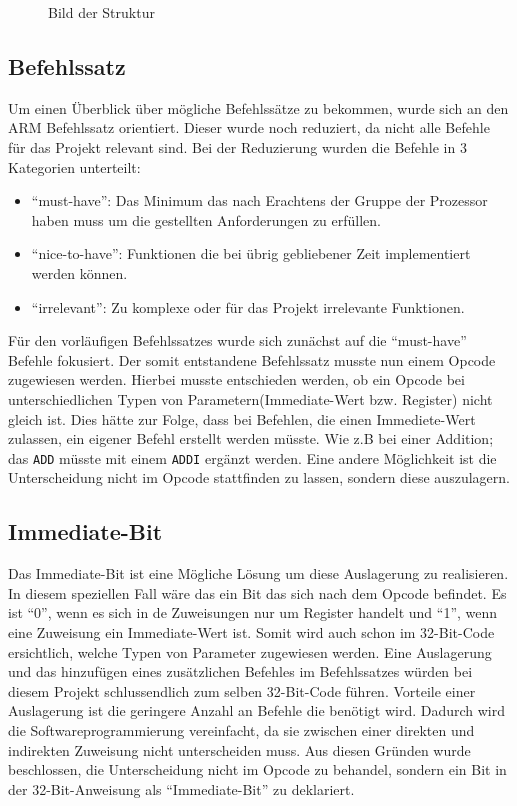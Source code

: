 \documentclass[paper=a4,fontsize=12pt,twocolumn]{scrreprt}
\begin{document}
\begin{figure}[h]
\centering
\caption{Bild der Struktur}
\end{figure}

\subsection{Befehlssatz}

Um einen Überblick über mögliche Befehlssätze zu bekommen, wurde sich an den ARM Befehlssatz orientiert\footnotemark.
Dieser wurde noch reduziert, da nicht alle Befehle für das Projekt relevant sind.
Bei der Reduzierung wurden die Befehle in 3 Kategorien unterteilt:
\begin{itemize}
    \item \enquote{must-have}:
    Das Minimum das nach Erachtens der Gruppe der Prozessor haben muss um die gestellten Anforderungen zu erfüllen.
    \item \enquote{nice-to-have}:
    Funktionen die bei übrig gebliebener Zeit implementiert werden können.
    \item \enquote{irrelevant}:
    Zu komplexe oder für das Projekt irrelevante Funktionen.
\end{itemize}
Für den vorläufigen Befehlssatzes wurde sich zunächst auf die \enquote{must-have} Befehle fokusiert. 
Der somit entstandene Befehlssatz musste nun einem Opcode zugewiesen werden. Hierbei musste entschieden werden, ob ein Opcode bei unterschiedlichen Typen von Parametern(Immediate-Wert bzw. Register) nicht gleich ist. Dies hätte zur Folge, dass bei Befehlen, die einen Immediete-Wert zulassen, ein eigener Befehl erstellt werden müsste. Wie z.B bei einer Addition; das \texttt{ADD} müsste mit einem \texttt{ADDI} ergänzt werden. Eine andere Möglichkeit ist die Unterscheidung nicht im Opcode stattfinden zu lassen, sondern diese auszulagern.


\subsection{Immediate-Bit}

Das Immediate-Bit ist eine Mögliche Lösung um diese Auslagerung zu realisieren. In diesem speziellen Fall wäre das ein Bit das sich nach dem Opcode befindet. Es ist \enquote{0}, wenn es sich in de Zuweisungen nur um Register handelt und \enquote{1}, wenn eine Zuweisung ein Immediate-Wert ist. Somit wird auch schon im 32-Bit-Code ersichtlich, welche Typen von Parameter zugewiesen werden.
Eine Auslagerung und das hinzufügen eines zusätzlichen Befehles im Befehlssatzes würden bei diesem Projekt schlussendlich zum selben 32-Bit-Code führen.
Vorteile einer Auslagerung ist die geringere Anzahl an Befehle die benötigt wird.
Dadurch wird die Softwareprogrammierung vereinfacht, da sie zwischen einer direkten und indirekten Zuweisung nicht unterscheiden muss.
Aus diesen Gründen wurde beschlossen, die Unterscheidung nicht im Opcode zu behandel, sondern ein Bit in der 32-Bit-Anweisung als \enquote{Immediate-Bit} zu deklariert.
\end{document}
